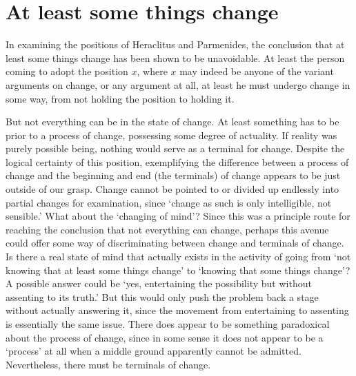 \section{At least some things change}

In examining the positions of Heraclitus and Parmenides, the conclusion that at least some things change has been shown to be unavoidable. At least the person coming to adopt the position $x$, where $x$ may indeed be anyone of the variant arguments on change, or any argument at all, at least he must undergo change in some way, from not holding the position to holding it.

But not everything can be in the state of change. At least something has to be prior to a process of change, possessing some degree of actuality. If reality was purely possible being, nothing would serve as a terminal for change. Despite the logical certainty of this position, exemplifying the difference between a process of change and the beginning and end (the terminals) of change appears to be just outside of our grasp. Change cannot be pointed to or divided up endlessly into partial changes for examination, since `change as such is only intelligible, not sensible.' \parencite[][48]{de1981christian}
What about the `changing of mind'? Since this was a principle route for reaching the conclusion that not everything can change, perhaps this avenue could offer some way of discriminating between change and terminals of change.
Is there a real state of mind that actually exists in the activity of going from `not knowing that at least some things change' to `knowing that some things change'? A possible answer could be `yes, entertaining the possibility but without assenting to its truth.' But this would only push the problem back a stage without actually answering it, since the movement from entertaining to assenting is essentially the same issue.
There does appear to be something paradoxical about the process of change, since in some sense it does not appear to be a `process' at all when a middle ground apparently cannot be admitted. Nevertheless, there must be terminals of change.

